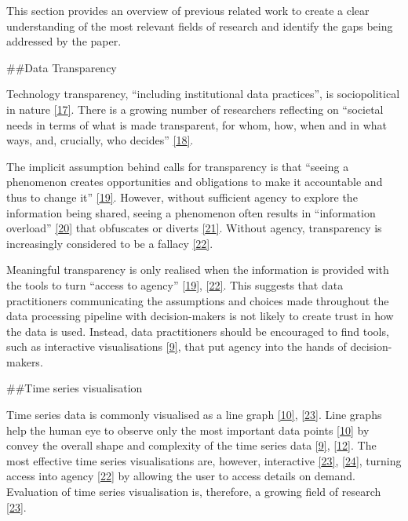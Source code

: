 \documentclass{article}
\begin{document}
\label{sec:headings}

This section provides an overview of previous related work to create a
clear understanding of the most relevant fields of research and identify
the gaps being addressed by the paper.

\#\#Data Transparency

Technology transparency, ``including institutional data practices'', is
sociopolitical in nature
\protect\hyperlink{ref-political_transparency}{{[}17{]}}. There is a
growing number of researchers reflecting on ``societal needs in terms of
what is made transparent, for whom, how, when and in what ways, and,
crucially, who decides''
\protect\hyperlink{ref-social_transparency}{{[}18{]}}.

The implicit assumption behind calls for transparency is that ``seeing a
phenomenon creates opportunities and obligations to make it accountable
and thus to change it''
\protect\hyperlink{ref-transparency_lack}{{[}19{]}}. However, without
sufficient agency to explore the information being shared, seeing a
phenomenon often results in ``information overload''
\protect\hyperlink{ref-digital_transparency}{{[}20{]}} that obfuscates
or diverts \protect\hyperlink{ref-transparency_obfuscation}{{[}21{]}}.
Without agency, transparency is increasingly considered to be a fallacy
\protect\hyperlink{ref-transparency_fallacy}{{[}22{]}}.

Meaningful transparency is only realised when the information is
provided with the tools to turn ``access to agency''
\protect\hyperlink{ref-transparency_lack}{{[}19{]}},
\protect\hyperlink{ref-transparency_fallacy}{{[}22{]}}. This suggests
that data practitioners communicating the assumptions and choices made
throughout the data processing pipeline with decision-makers is not
likely to create trust in how the data is used. Instead, data
practitioners should be encouraged to find tools, such as interactive
visualisations \protect\hyperlink{ref-datapoint}{{[}9{]}}, that put
agency into the hands of decision-makers.

\#\#Time series visualisation

Time series data is commonly visualised as a line graph
\protect\hyperlink{ref-Sveinn}{{[}10{]}},
\protect\hyperlink{ref-timenotes}{{[}23{]}}. Line graphs help the human
eye to observe only the most important data points
\protect\hyperlink{ref-Sveinn}{{[}10{]}} by convey the overall shape and
complexity of the time series data
\protect\hyperlink{ref-datapoint}{{[}9{]}},
\protect\hyperlink{ref-downsampling}{{[}12{]}}. The most effective time
series visualisations are, however, interactive
\protect\hyperlink{ref-timenotes}{{[}23{]}},
\protect\hyperlink{ref-plotly}{{[}24{]}}, turning access into agency
\protect\hyperlink{ref-transparency_fallacy}{{[}22{]}} by allowing the
user to access details on demand. Evaluation of time series
visualisation is, therefore, a growing field of research
\protect\hyperlink{ref-timenotes}{{[}23{]}}.
\end{document}
